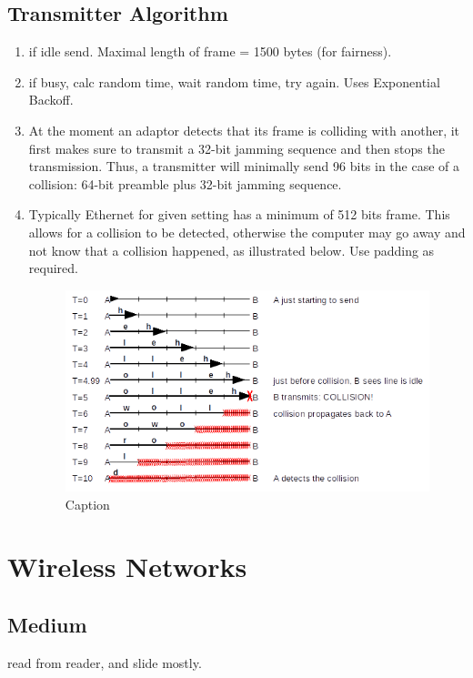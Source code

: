 \documentclass[12pt]{book}
\begin{document}
\subsection{Transmitter Algorithm}
\begin{enumerate}
    \item if idle send. Maximal length of frame = 1500 bytes (for fairness).
    \item if busy, calc random time, wait random time, try again. Uses Exponential Backoff.
    \item At the moment an adaptor detects that its frame is colliding with another, it first makes sure to transmit a 32-bit jamming sequence and then stops the transmission. Thus, a transmitter will minimally send 96 bits in the case of a collision: 64-bit preamble plus 32-bit jamming sequence.
    \item Typically Ethernet for given setting has a minimum of 512 bits frame. This allows for a collision to be detected, otherwise the computer may go away and not know that a collision happened, as illustrated below. Use padding as required.
    \begin{figure}[H]
        \centering
        \includegraphics[width = \textwidth]{Pictures/MultiAccess- Collision Detection.png}
        \caption{Caption}
        \label{fig:my_label}
    \end{figure}
\end{enumerate}

\section{Wireless Networks}
\subsection{Medium}
read from reader, and slide mostly.
\end{document}
